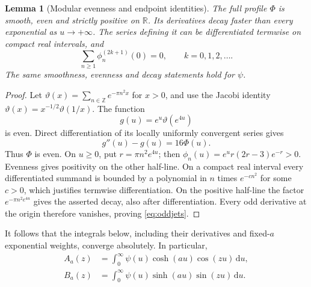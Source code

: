 \documentclass[11pt,letterpaper]{article}
\numberwithin{equation}{section}
\newtheorem{lemma}[theorem]{Lemma}
\theoremstyle{definition}
\theoremstyle{remark}
\newcommand{\R}{\mathbb R}
\newcommand{\dd}{\,\mathrm d}
\begin{document}
\begin{lemma}[Modular evenness and endpoint identities]\label{lem:modularity}
The full profile $\Phi$ is smooth, even and strictly positive on $\R$. Its derivatives decay faster than every exponential as $u\to+\infty$. The series defining it can be differentiated termwise on compact real intervals, and
\begin{equation}\label{eq:oddjets}
\sum_{n\ge1}\phi_n^{(2k+1)}(0)=0,\qquad k=0,1,2,\ldots.
\end{equation}
The same smoothness, evenness and decay statements hold for $\psi$.
\end{lemma}
\begin{proof}
Let $\vartheta(x)=\sum_{n\in\mathbb Z}e^{-\pi n^2x}$ for $x>0$, and use the Jacobi identity $\vartheta(x)=x^{-1/2}\vartheta(1/x)$. The function
\[
g(u)=e^u\vartheta(e^{4u})
\]
is even. Direct differentiation of its locally uniformly convergent series gives
\[
g''(u)-g(u)=16\Phi(u).
\]
Thus $\Phi$ is even. On $u\ge0$, put $r=\pi n^2e^{4u}$; then $\phi_n(u)=e^ur(2r-3)e^{-r}>0$. Evenness gives positivity on the other half-line. On a compact real interval every differentiated summand is bounded by a polynomial in $n$ times $e^{-c n^2}$ for some $c>0$, which justifies termwise differentiation. On the positive half-line the factor $e^{-\pi n^2e^{4u}}$ gives the asserted decay, also after differentiation. Every odd derivative at the origin therefore vanishes, proving \eqref{eq:oddjets}.
\end{proof}

It follows that the integrals below, including their derivatives and fixed-$a$ exponential weights, converge absolutely. In particular,
\begin{equation}\label{eq:ABintegrals}
\begin{aligned}
A_a(z)&=\int_0^\infty\psi(u)\cosh(au)\cos(zu)\dd u,\\
B_a(z)&=\int_0^\infty\psi(u)\sinh(au)\sin(zu)\dd u.
\end{aligned}
\end{equation}
\end{document}
